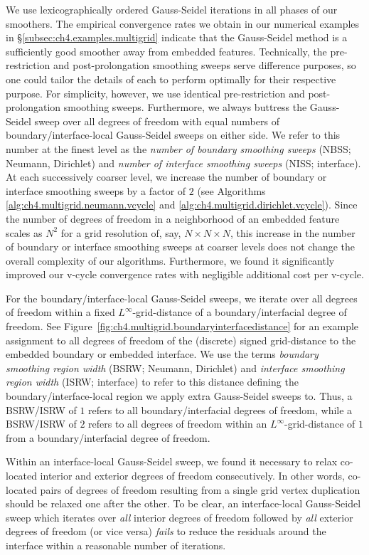 We use lexicographically ordered Gauss-Seidel iterations in all phases of our smoothers. The empirical convergence rates we obtain in our numerical examples in \S\ref{subsec:ch4.examples.multigrid} indicate that the Gauss-Seidel method is a sufficiently good smoother away from embedded features. Technically, the pre-restriction and post-prolongation smoothing sweeps serve difference purposes, so one could tailor the details of each to perform optimally for their respective purpose. For simplicity, however, we use identical pre-restriction and post-prolongation smoothing sweeps. Furthermore, we always buttress the Gauss-Seidel sweep over all degrees of freedom with equal numbers of boundary/interface-local Gauss-Seidel sweeps on either side. We refer to this number at the finest level as the \emph{number of boundary smoothing sweeps} (NBSS; Neumann, Dirichlet) and \emph{number of interface smoothing sweeps} (NISS; interface). At each successively coarser level, we increase the number of boundary or interface smoothing sweeps by a factor of $2$ (see Algorithms \ref{alg:ch4.multigrid.neumann.vcycle} and \ref{alg:ch4.multigrid.dirichlet.vcycle}). Since the number of degrees of freedom in a neighborhood of an embedded feature scales as $N^2$ for a grid resolution of, say, $N \times N \times N$, this increase in the number of boundary or interface smoothing sweeps at coarser levels does not change the overall complexity of our algorithms. Furthermore, we found it significantly improved our v-cycle convergence rates with negligible additional cost per v-cycle.

For the boundary/interface-local Gauss-Seidel sweeps, we iterate over all degrees of freedom within a fixed $L^{\infty}$-grid-distance of a boundary/interfacial degree of freedom. See Figure~\ref{fig:ch4.multigrid.boundaryinterfacedistance} for an example assignment to all degrees of freedom of the (discrete) signed grid-distance to the embedded boundary or embedded interface. We use the terms \emph{boundary smoothing region width} (BSRW; Neumann, Dirichlet) and \emph{interface smoothing region width} (ISRW; interface) to refer to this distance defining the boundary/interface-local region we apply extra Gauss-Seidel sweeps to. Thus, a BSRW/ISRW of $1$ refers to all boundary/interfacial degrees of freedom, while a BSRW/ISRW of $2$ refers to all degrees of freedom within an $L^{\infty}$-grid-distance of $1$ from a boundary/interfacial degree of freedom.

Within an interface-local Gauss-Seidel sweep, we found it necessary to relax co-located interior and exterior degrees of freedom consecutively. In other words, co-located pairs of degrees of freedom resulting from a single grid vertex duplication should be relaxed one after the other. To be clear, an interface-local Gauss-Seidel sweep which iterates over \emph{all} interior degrees of freedom followed by \emph{all} exterior degrees of freedom (or vice versa) \emph{fails} to reduce the residuals around the interface within a reasonable number of iterations.

